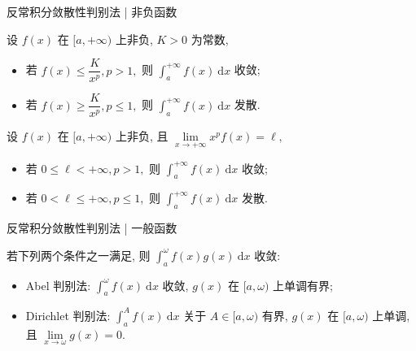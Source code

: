 \begin{frame}{反常积分敛散性判别法 | {\smaller[1] 非负函数}}

\begin{thm}
设 $f(x)$ 在 $[a, +\infty)$ 上非负, $K > 0$ 为常数,
\begin{itemize}
\item 若 $f(x) \leqslant \dfrac{K}{x^p}, p > 1,$ 则 $\int_a^{+\infty} f(x) ~ \mathrm{d} x $ 收敛;
\item 若 $f(x) \geqslant \dfrac{K}{x^p}, p \leqslant 1,$ 则 $\int_a^{+\infty} f(x) ~ \mathrm{d} x $ 发散.
\end{itemize}
\end{thm}

\pause

\begin{thm}
设 $f(x)$ 在 $[a, +\infty)$ 上非负, 且 $\lim\limits_{x \to +\infty} x^p f(x) = \ell,$
\begin{itemize}
\item 若 $0 \leqslant \ell < +\infty, p > 1,$ 则 $\int_a^{+\infty} f(x) ~ \mathrm{d} x $ 收敛;
\item 若 $0 < \ell \leqslant +\infty, p \leqslant 1,$ 则 $\int_a^{+\infty} f(x) ~ \mathrm{d} x $ 发散.
\end{itemize}
\end{thm}

\end{frame}


\begin{frame}{反常积分敛散性判别法 | {\smaller[1] 一般函数}}

\begin{thm}[A-D 判别法]
若下列两个条件之一满足, 则 $\int_a^\omega f(x)g(x) ~ \mathrm{d} x$ 收敛:
\pause
\begin{itemize}[<+->]
\item Abel 判别法: $\int_a^\omega f(x) ~ \mathrm{d} x$ 收敛, $g(x)$ 在 $[a, \omega)$ 上单调有界;
\item Dirichlet 判别法: $\int_a^A f(x) ~ \mathrm{d} x$ 关于 $A \in [a, \omega)$ 有界, $g(x)$ 在 $[a, \omega)$ 上单调, 且 $\lim\limits_{x \to \omega} g(x) = 0.$
\end{itemize}
\end{thm}

\end{frame}


